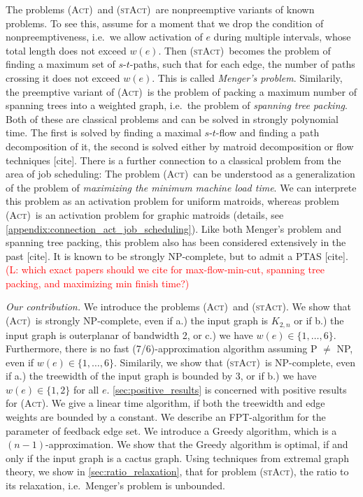 \documentclass[runningheads]{llncs}
\numberwithin{equation}{section}
\newcommand{\set}[1]{\{ #1 \}}
\newcommand{\fromto}[2]{\set{#1, \ldots, #2}}
\newcommand{\comment}[1]{\textcolor{red}{(L: #1)}}
\newcommand{\act}{\textsc{(Act)}}
\newcommand{\stact}{\textsc{(stAct)}}
\begin{document}
The problems \act\ and \stact\ are nonpreemptive variants of known problems. To see this, assume for a moment that we drop the condition of nonpreemptiveness, i.e.\ we allow activation of $e$ during multiple intervals, whose total length does not exceed $w(e)$. Then \stact\ becomes the problem of finding a maximum set of $s$-$t$-paths, such that for each edge, the number of paths crossing it does not exceed $w(e)$. This is called \emph{Menger's problem}. Similarily, the preemptive variant of \act\ is the problem of packing a maximum number of spanning trees into a weighted graph, i.e.\ the problem of \emph{spanning tree packing}. Both of these are classical problems and can be solved in strongly polynomial time. The first is solved by finding a maximal $s$-$t$-flow and finding a path decomposition of it, the second is solved either by matroid decomposition or flow techniques [cite]. There is a further connection to a classical problem from the area of job scheduling: The problem \act\ can be understood as a generalization of the problem of \emph{maximizing the minimum machine load time}. We can interprete this problem as an activation problem for uniform matroids, whereas problem \act\ is an activation problem for graphic matroids (details, see \cref{appendix:connection_act_job_scheduling}). Like both Menger's problem and spanning tree packing, this problem also has been considered extensively in the past [cite]. It is known to be strongly NP-complete, but to admit a PTAS [cite]. \comment{which exact papers should we cite for max-flow-min-cut, spanning tree packing, and maximizing min finish time?}

\emph{Our contribution.}
We introduce the problems \act\ and \stact. We show that \act\ is strongly NP-complete, even if a.) the input graph is $K_{2,n}$ or if b.) the input graph is outerplanar of bandwidth 2, or c.) we have $w(e) \in \fromto{1}{6}$. Furthermore, there is no fast (7/6)-approximation algorithm assuming P $\neq$ NP, even if $w(e) \in \fromto{1}{6}$. Similarily, we show that \stact\ is NP-complete, even if a.) the treewidth of the input graph is bounded by 3, or if b.) we have $w(e) \in \set{1,2}$ for all $e$. 
\cref{sec:positive_results} is concerned with positive results for {\act}. We give a linear time algorithm, if both the treewidth and edge weights are bounded by a constant. We describe an FPT-algorithm for the parameter of feedback edge set. We introduce a Greedy algorithm, which is a $(n-1)$-approximation. We show that the Greedy algorithm is optimal, if and only if the input graph is a cactus graph. Using techniques from extremal graph theory, we show in \cref{sec:ratio_relaxation}, that for problem \stact, the ratio to its relaxation, i.e.\ Menger's problem is unbounded.
\end{document}
